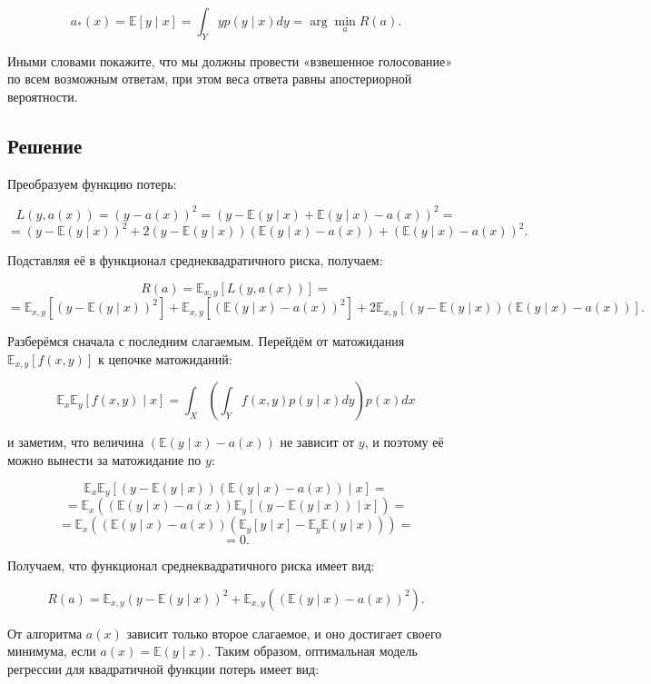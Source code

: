 \[
    a_*(x) = \mathbb{E}[y \mid x] = \int_Y y p(y \mid x) dy = \arg \min_a R(a).
\]

Иными словами покажите, что мы должны провести «взвешенное голосование» по всем возможным ответам, при этом веса ответа равны апостериорной вероятности.

\subsection*{Решение}

Преобразуем функцию потерь:

\[
    L(y, a(x)) = (y - a(x))^2 = (y - \mathbb{E}(y \mid x) + \mathbb{E}(y \mid x) - a(x))^2 =
\]
\[
    = (y - \mathbb{E}(y \mid x))^2 + 2(y - \mathbb{E}(y \mid x))(\mathbb{E}(y \mid x) - a(x)) + (\mathbb{E}(y \mid x) - a(x))^2.
\]

Подставляя её в функционал среднеквадратичного риска, получаем:

\[
    R(a) = \mathbb{E}_{x,y}[L(y, a(x))] =
\]
\[
    = \mathbb{E}_{x,y}[(y - \mathbb{E}(y \mid x))^2] + \mathbb{E}_{x,y}[(\mathbb{E}(y \mid x) - a(x))^2] +
    2 \mathbb{E}_{x,y}[(y - \mathbb{E}(y \mid x))(\mathbb{E}(y \mid x) - a(x))].
\]

Разберёмся сначала с последним слагаемым. Перейдём от матожидания \(\mathbb{E}_{x,y}[f(x, y)]\) к цепочке матожиданий:

\[
    \mathbb{E}_x \mathbb{E}_y[f(x, y) \mid x] = \int_X \left( \int_Y f(x, y) p(y \mid x) dy \right) p(x) dx
\]

и заметим, что величина \((\mathbb{E}(y \mid x) - a(x))\) не зависит от \(y\), и поэтому её можно вынести за матожидание по \(y\):

\[
    \mathbb{E}_x \mathbb{E}_y \left[ (y - \mathbb{E}(y \mid x))(\mathbb{E}(y \mid x) - a(x)) \mid x \right] =
\]
\[
    = \mathbb{E}_x \left( (\mathbb{E}(y \mid x) - a(x)) \mathbb{E}_y \left[ (y - \mathbb{E}(y \mid x)) \mid x \right] \right) =
\]
\[
    = \mathbb{E}_x \left( (\mathbb{E}(y \mid x) - a(x)) (\mathbb{E}_y[y \mid x] - \mathbb{E}_y \mathbb{E}(y \mid x)) \right) =
\]
\[
    = 0.
\]

Получаем, что функционал среднеквадратичного риска имеет вид:

\[
    R(a) = \mathbb{E}_{x,y}(y - \mathbb{E}(y \mid x))^2 + \mathbb{E}_{x,y}((\mathbb{E}(y \mid x) - a(x))^2).
\]

От алгоритма \(a(x)\) зависит только второе слагаемое, и оно достигает своего минимума, если \(a(x) = \mathbb{E}(y \mid x)\). Таким образом, оптимальная модель регрессии для квадратичной функции потерь имеет вид:

